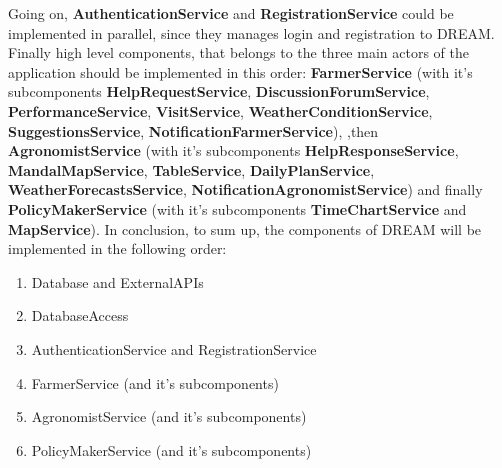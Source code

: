 Going on, \textbf{AuthenticationService} and \textbf{RegistrationService} could be implemented in parallel, since they manages login and registration to DREAM.\newline
Finally high level components, that belongs to the three main actors of the application should be implemented in this order: \textbf{FarmerService} (with it's subcomponents \textbf{HelpRequestService}, \textbf{DiscussionForumService}, \textbf{PerformanceService}, \textbf{VisitService}, \textbf{WeatherConditionService}, \textbf{SuggestionsService}, \textbf{NotificationFarmerService}),\newline
,then \textbf{AgronomistService} (with it's subcomponents \textbf{HelpResponseService}, \textbf{MandalMapService}, \textbf{TableService}, \textbf{DailyPlanService}, \textbf{WeatherForecastsService}, \textbf{NotificationAgronomistService}) \newline and finally \textbf{PolicyMakerService} (with it's subcomponents \textbf{TimeChartService} and \textbf{MapService}).\newline
In conclusion, to sum up, the components of DREAM will be implemented in the following order:
\begin{enumerate}
  \item Database and ExternalAPIs
  \item DatabaseAccess
  \item AuthenticationService and RegistrationService
  \item FarmerService (and it's subcomponents)
  \item AgronomistService (and it's subcomponents)
  \item PolicyMakerService (and it's subcomponents)
\end{enumerate}
\newpage